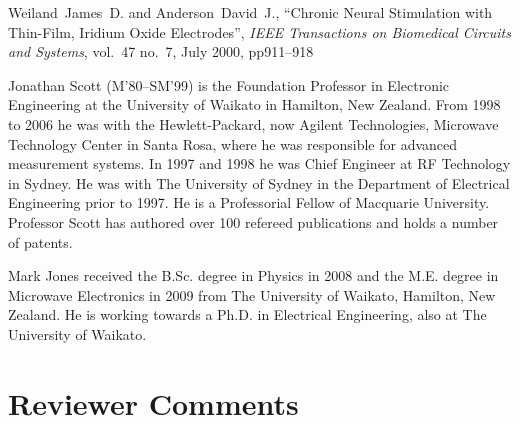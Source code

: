 \documentclass[journal, a4paper]{IEEEtran}
\begin{document}
{\begin{thebibliography}{99}
Weiland~James~D. and Anderson~David~J.,
``Chronic Neural Stimulation with Thin-Film, Iridium Oxide Electrodes'',
{\em IEEE Transactions on Biomedical Circuits and Systems},
vol.~47 no.~7, July 2000, pp911--918




\end{thebibliography}


\begin{IEEEbiography}{Jonathan Scott}
(M'80--SM'99) is the Foundation Professor in
Electronic Engineering at the University of Waikato in Hamilton, New
Zealand.  From 1998 to 2006 he was with the Hewlett-Packard,
now Agilent Technologies, Microwave Technology Center in Santa Rosa,
where he was responsible for advanced measurement systems.  In 1997 and
1998 he was Chief Engineer at RF Technology in Sydney.  He was with The
University of Sydney in the Department of Electrical Engineering prior
to 1997.  He is a Professorial Fellow of Macquarie
University.  Professor Scott has authored over 100 refereed
publications and holds a number of patents.
\end{IEEEbiography}


\begin{IEEEbiography}{Mark Jones}
received the B.Sc. degree in Physics in 2008 and the M.E. degree in Microwave Electronics in 2009 from The University of Waikato, Hamilton, New Zealand.
He is working towards a Ph.D. in Electrical Engineering, also at The University of Waikato.
\end{IEEEbiography}

\section*{Reviewer Comments}

}
\end{document}
